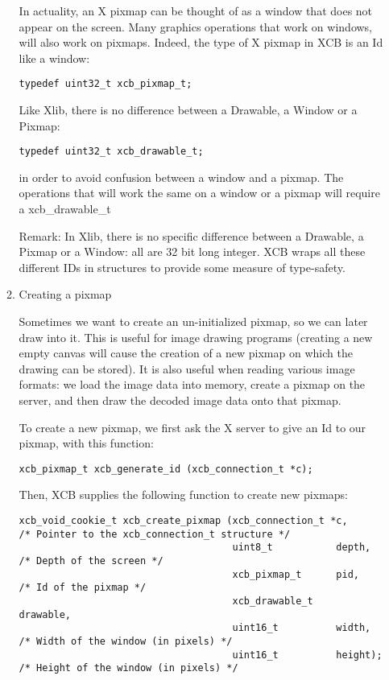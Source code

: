 \documentclass[12pt,oneside,titlepage]{book}
\begin{document}
\begin{enumerate}
\begin{enumerate}
    In actuality, an X pixmap can be thought of as a window that does
    not appear on the screen. Many graphics operations that work on
    windows, will also work on pixmaps. Indeed, the type of X pixmap in
    XCB is an Id like a window:

\begin{verbatim}
typedef uint32_t xcb_pixmap_t;
\end{verbatim}

    Like Xlib, there is no difference between a Drawable, a Window or a
    Pixmap:

\begin{verbatim}
typedef uint32_t xcb_drawable_t;
\end{verbatim}

    in order to avoid confusion between a window and a pixmap. The
    operations that will work the same on a window or a pixmap will
    require a {xcb\_drawable\_t}

    Remark: In Xlib, there is no specific difference between a
    {Drawable}, a {Pixmap} or a {Window}: all are 32 bit long integer.
    XCB wraps all these different IDs in structures to provide some
    measure of type-safety.
  \item
    \protect\hypertarget{pixmapscreate}{}{Creating a pixmap}

    Sometimes we want to create an un-initialized pixmap, so we can
    later draw into it. This is useful for image drawing programs
    (creating a new empty canvas will cause the creation of a new pixmap
    on which the drawing can be stored). It is also useful when reading
    various image formats: we load the image data into memory, create a
    pixmap on the server, and then draw the decoded image data onto that
    pixmap.

    To create a new pixmap, we first ask the X server to give an Id to
    our pixmap, with this function:

\begin{verbatim}
xcb_pixmap_t xcb_generate_id (xcb_connection_t *c);
\end{verbatim}

    Then, XCB supplies the following function to create new pixmaps:

\begin{verbatim}
xcb_void_cookie_t xcb_create_pixmap (xcb_connection_t *c,         /* Pointer to the xcb_connection_t structure */
                                     uint8_t           depth,     /* Depth of the screen */
                                     xcb_pixmap_t      pid,       /* Id of the pixmap */
                                     xcb_drawable_t    drawable,
                                     uint16_t          width,     /* Width of the window (in pixels) */
                                     uint16_t          height);   /* Height of the window (in pixels) */
\end{verbatim}


\end{enumerate}
\end{enumerate}
\end{document}
